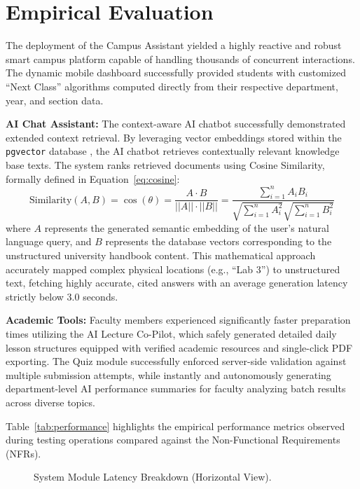\documentclass[]{einformatica}
\begin{document}
\section{Empirical Evaluation}\label{sec:Results}

The deployment of the Campus Assistant yielded a highly reactive and robust smart campus platform capable of handling thousands of concurrent interactions. The dynamic mobile dashboard successfully provided students with customized ``Next Class'' algorithms computed directly from their respective department, year, and section data.

\textbf{AI Chat Assistant:} The context-aware AI chatbot successfully demonstrated extended context retrieval. By leveraging vector embeddings stored within the \texttt{pgvector} database \cite{johnson2017}, the AI chatbot retrieves contextually relevant knowledge base texts. The system ranks retrieved documents using Cosine Similarity, formally defined in Equation~\ref{eq:cosine}:
\begin{equation} \label{eq:cosine}
\text{Similarity}(A, B) = \cos(\theta) = \frac{A \cdot B}{||A|| \cdot ||B||} = \frac{\sum_{i=1}^{n} A_i B_i}{\sqrt{\sum_{i=1}^{n} A_i^2} \sqrt{\sum_{i=1}^{n} B_i^2}}
\end{equation}
where $A$ represents the generated semantic embedding of the user's natural language query, and $B$ represents the database vectors corresponding to the unstructured university handbook content. This mathematical approach accurately mapped complex physical locations (e.g., ``Lab 3'') to unstructured text, fetching highly accurate, cited answers with an average generation latency strictly below 3.0 seconds.

\textbf{Academic Tools:} Faculty members experienced significantly faster preparation times utilizing the AI Lecture Co-Pilot, which safely generated detailed daily lesson structures equipped with verified academic resources and single-click PDF exporting. The Quiz module successfully enforced server-side validation against multiple submission attempts, while instantly and autonomously generating department-level AI performance summaries for faculty analyzing batch results across diverse topics.

Table~\ref{tab:performance} highlights the empirical performance metrics observed during testing operations compared against the Non-Functional Requirements (NFRs).

\begin{figure}[htbp]
\centering
{}
\caption{System Module Latency Breakdown (Horizontal View).}
\label{fig:latency}
\end{figure}
\end{document}
